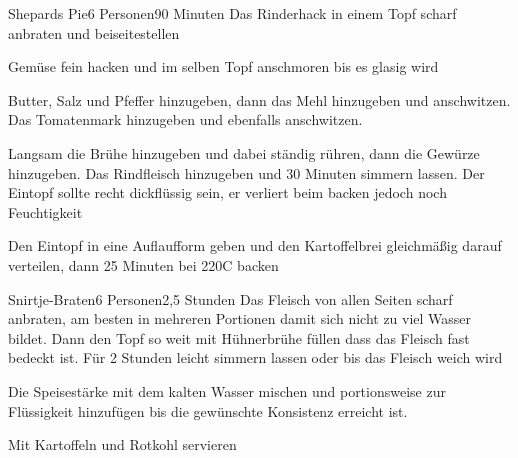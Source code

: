 
\begin{recipe}{Shepards Pie}{6 Personen}{90 Minuten}
Das Rinderhack in einem Topf scharf anbraten und beiseitestellen

Gemüse fein hacken und im selben Topf anschmoren bis es glasig wird

Butter, Salz und Pfeffer hinzugeben, dann das Mehl hinzugeben und anschwitzen. Das Tomatenmark hinzugeben und ebenfalls anschwitzen.

Langsam die Brühe hinzugeben und dabei ständig rühren, dann die Gewürze hinzugeben. Das Rindfleisch hinzugeben und 30 Minuten simmern lassen. Der Eintopf sollte recht dickflüssig sein, er verliert beim backen jedoch noch Feuchtigkeit

Den Eintopf in eine Auflaufform geben und den Kartoffelbrei gleichmäßig darauf verteilen, dann 25 Minuten bei 220\0C backen
\end{recipe}


\begin{recipe}{Snirtje-Braten}{6 Personen}{2,5 Stunden}
Das Fleisch von allen Seiten scharf  anbraten, am besten in mehreren Portionen damit sich nicht zu viel Wasser bildet. Dann den Topf so weit mit Hühnerbrühe füllen dass das Fleisch fast bedeckt ist. Für 2 Stunden leicht simmern lassen oder bis das Fleisch weich wird

Die Speisestärke mit dem kalten Wasser mischen und portionsweise zur Flüssigkeit hinzufügen bis die gewünschte Konsistenz erreicht ist.

Mit Kartoffeln und Rotkohl servieren
\end{recipe}



